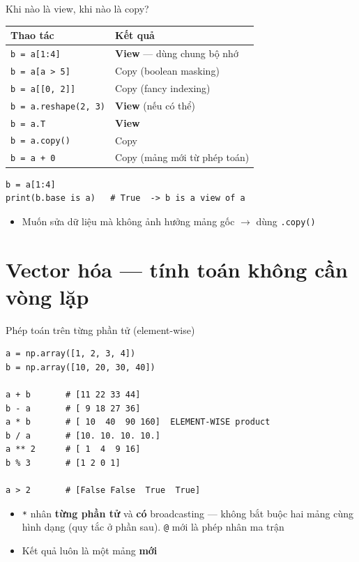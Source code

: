 \documentclass[11pt]{beamer}
\begin{document}
\begin{frame}[fragile]{Khi nào là view, khi nào là copy?}
\begin{center}
\small
\begin{tabular}{|l|l|}
\hline
\textbf{Thao tác} & \textbf{Kết quả} \\
\hline
\texttt{b = a[1:4]}          & \textbf{View} --- dùng chung bộ nhớ \\
\texttt{b = a[a > 5]}        & Copy (boolean masking) \\
\texttt{b = a[[0, 2]]}       & Copy (fancy indexing) \\
\texttt{b = a.reshape(2, 3)} & \textbf{View} (nếu có thể) \\
\texttt{b = a.T}             & \textbf{View} \\
\texttt{b = a.copy()}        & Copy \\
\texttt{b = a + 0}           & Copy (mảng mới từ phép toán) \\
\hline
\end{tabular}
\end{center}
\begin{lstlisting}
b = a[1:4]
print(b.base is a)   # True  -> b is a view of a
\end{lstlisting}
\begin{itemize}
  \item Muốn sửa dữ liệu mà không ảnh hưởng mảng gốc $\to$ dùng \texttt{.copy()}
\end{itemize}
\end{frame}

\section{Vector hóa --- tính toán không cần vòng lặp}

\begin{frame}[fragile]{Phép toán trên từng phần tử (element-wise)}
\begin{lstlisting}
a = np.array([1, 2, 3, 4])
b = np.array([10, 20, 30, 40])

a + b       # [11 22 33 44]
b - a       # [ 9 18 27 36]
a * b       # [ 10  40  90 160]  ELEMENT-WISE product
b / a       # [10. 10. 10. 10.]
a ** 2      # [ 1  4  9 16]
b % 3       # [1 2 0 1]

a > 2       # [False False  True  True]
\end{lstlisting}
\begin{itemize}
  \item \texttt{*} nhân \textbf{từng phần tử} và \textbf{có} broadcasting --- không bắt buộc hai mảng
        cùng hình dạng (quy tắc ở phần sau). \texttt{@} mới là phép nhân ma trận
  \item Kết quả luôn là một mảng \textbf{mới}
\end{itemize}
\end{frame}
\end{document}
